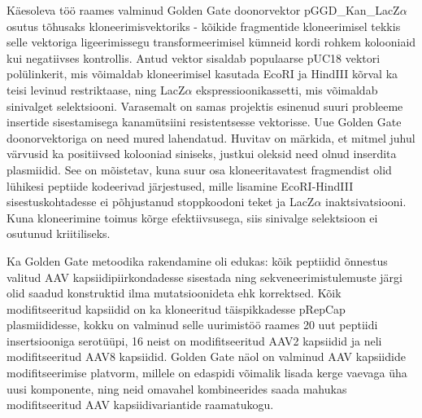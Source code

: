 \documentclass{trkut}%
\begin{document}

Käesoleva töö raames valminud Golden Gate doonorvektor pGGD\_Kan\_LacZ$\alpha$ osutus tõhusaks kloneerimisvektoriks - kõikide fragmentide kloneerimisel tekkis selle vektoriga ligeerimissegu transformeerimisel kümneid kordi rohkem kolooniaid kui negatiivses kontrollis. Antud vektor sisaldab populaarse pUC18 vektori polülinkerit, mis võimaldab kloneerimisel kasutada EcoRI ja HindIII kõrval ka teisi levinud restriktaase, ning LacZ$\alpha$ ekspressioonikassetti, mis võimaldab sinivalget selektsiooni. Varasemalt on samas projektis esinenud suuri probleeme insertide sisestamisega kanamütsiini resistentsesse vektorisse. Uue Golden Gate doonorvektoriga on need mured lahendatud. Huvitav on märkida, et mitmel juhul värvusid ka positiivsed kolooniad siniseks, justkui oleksid need olnud inserdita plasmiidid. See on mõistetav, kuna suur osa kloneeritavatest fragmendist olid lühikesi peptiide kodeerivad järjestused, mille lisamine EcoRI-HindIII sisestuskohtadesse ei põhjustanud stoppkoodoni teket ja LacZ$\alpha$ inaktsivatsiooni. Kuna kloneerimine toimus kõrge efektiivsusega, siis sinivalge selektsioon ei osutunud kriitiliseks. 


Ka Golden Gate metoodika rakendamine oli edukas: kõik peptiidid õnnestus valitud AAV kapsiidipiirkondadesse sisestada ning sekveneerimistulemuste järgi olid saadud konstruktid ilma mutatsioonideta ehk korrektsed. Kõik modifitseeritud kapsiidid on ka kloneeritud täispikkadesse pRepCap plasmiididesse, kokku on valminud selle uurimistöö raames 20 uut peptiidi insertsiooniga serotüüpi, 16 neist on modifitseeritud AAV2 kapsiidid ja neli modifitseeritud AAV8 kapsiidid. Golden Gate näol on valminud AAV kapsiidide modifitseerimise platvorm, millele on edaspidi võimalik lisada kerge vaevaga üha uusi komponente, ning neid omavahel kombineerides saada mahukas modifitseeritud AAV kapsiidivariantide raamatukogu.
\end{document}
